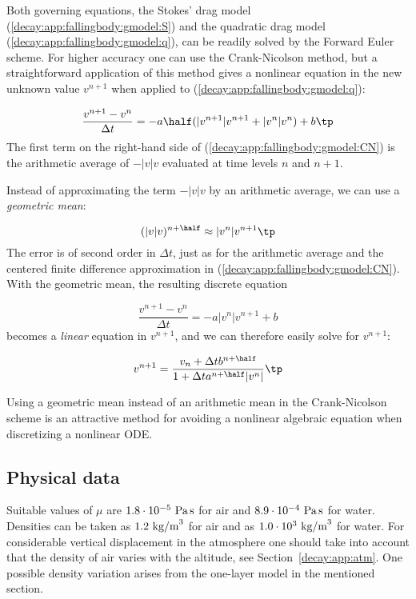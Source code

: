 \documentclass[graybox,sectrefs,envcountresetchap,open=right,final]{svmonodo}
\begin{document}
Both governing equations, the Stokes' drag model
(\ref{decay:app:fallingbody:gmodel:S}) and the quadratic drag model
(\ref{decay:app:fallingbody:gmodel:q}), can be readily solved
by the Forward Euler scheme. For higher accuracy one can use
the Crank-Nicolson method, but a straightforward application
of this method gives
a nonlinear equation in the new unknown value $v^{n+1}$ when applied to
(\ref{decay:app:fallingbody:gmodel:q}):

\begin{equation}
\frac{v^{n+1}-v^n}{\Delta t}
= -a\half(|v^{n+1}|v^{n+1} + |v^n|v^n) + b
\label{decay:app:fallingbody:gmodel:CN}
\tp
\end{equation}
The first term on the right-hand side of (\ref{decay:app:fallingbody:gmodel:CN})
is the arithmetic average of $-|v|v$ evaluated at time levels $n$ and $n+1$.

Instead of approximating the term $-|v|v$ by an arithmetic
average, we can use a \emph{geometric mean}:


\begin{equation}
(|v|v)^{n+\half} \approx |v^n|v^{n+1}
\tp
\end{equation}
The error is of second order in $\Delta t$, just as for the arithmetic
average and the centered finite difference approximation in
(\ref{decay:app:fallingbody:gmodel:CN}). With the geometric mean,
the resulting discrete equation

\[
\frac{v^{n+1}-v^n}{\Delta t} = - a|v^{n}|v^{n+1} + b
\]
becomes a \emph{linear} equation in $v^{n+1}$, and we can
therefore easily solve for $v^{n+1}$:

\begin{equation}
v^{n+1} = \frac{v_n + \Delta t b^{n+\half}}{1 + \Delta t a^{n+\half}|v^{n}|}\tp
\label{decay:app:fallingbody:gmodel:q:CN}
\end{equation}

Using a geometric mean instead of an arithmetic mean in the Crank-Nicolson
scheme is an attractive method for avoiding a nonlinear algebraic
equation when discretizing a nonlinear ODE.


\subsection{Physical data}

Suitable values of $\mu$ are $1.8\cdot 10^{-5}\hbox{ Pa}\, \hbox{s}$ for air
and $8.9\cdot 10^{-4}\hbox{ Pa}\, \hbox{s}$ for water.
Densities can be taken as $1.2\hbox{ kg/m}^3$ for air and as
$1.0\cdot 10^3\hbox{ kg/m}^3$ for water. For considerable vertical
displacement in the atmosphere one should take into account that
the density of air varies with the altitude, see Section~\ref{decay:app:atm}.
One possible density variation arises from the one-layer model
in the mentioned section.
\end{document}
